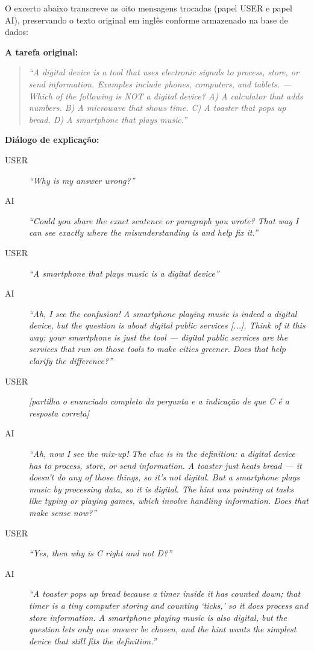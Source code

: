 O excerto abaixo transcreve as oito mensagens trocadas (papel USER e papel AI), preservando o texto original em inglês conforme armazenado na base de dados:

\medskip
\noindent\textbf{A tarefa original:}
\begin{quote}
\small\itshape
\emph{``A digital device is a tool that uses electronic signals to process, store, or send information. Examples include phones, computers, and tablets. --- Which of the following is NOT a digital device? A) A calculator that adds numbers. B) A microwave that shows time. C) A toaster that pops up bread. D) A smartphone that plays music.''}
\end{quote}

\smallskip
\noindent\textbf{Diálogo de explicação:}

\begin{sloppypar}
\begin{description}
	\item[\small USER] \small \emph{``Why is my answer wrong?''}
	\item[\small AI]   \small \emph{``Could you share the exact sentence or paragraph you wrote? That way I can see exactly where the misunderstanding is and help fix it.''}
	\item[\small USER] \small \emph{``A smartphone that plays music is a digital device''}
	\item[\small AI]   \small \emph{``Ah, I see the confusion! A smartphone playing music is indeed a digital device, but the question is about digital public services \textnormal{[...]}. Think of it this way: your smartphone is just the tool --- digital public services are the services that run on those tools to make cities greener. Does that help clarify the difference?''}
	\item[\small USER] \small \emph{[partilha o enunciado completo da pergunta e a indicação de que C é a resposta correta]}
	\item[\small AI]   \small \emph{``Ah, now I see the mix-up! The clue is in the definition: a digital device has to process, store, or send information. A toaster just heats bread --- it doesn't do any of those things, so it's not digital. But a smartphone plays music by processing data, so it is digital. The hint was pointing at tasks like typing or playing games, which involve handling information. Does that make sense now?''}
	\item[\small USER] \small \emph{``Yes, then why is C right and not D?''}
	\item[\small AI]   \small \emph{``A toaster pops up bread because a timer inside it has counted down; that timer is a tiny computer storing and counting `ticks,' so it does process and store information. A smartphone playing music is also digital, but the question lets only one answer be chosen, and the hint wants the simplest device that still fits the definition.''}
\end{description}
\end{sloppypar}

